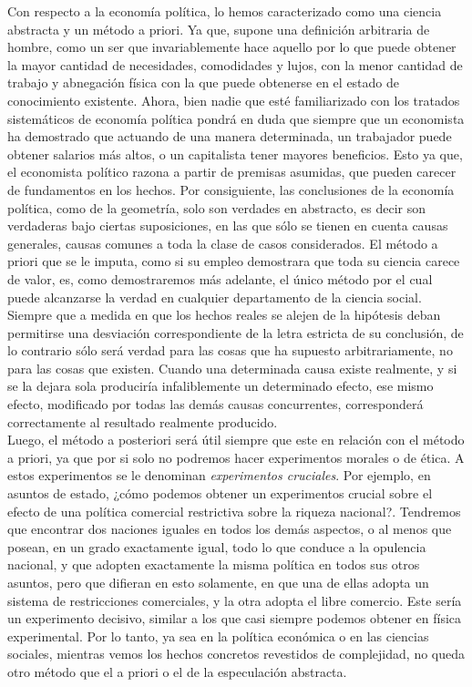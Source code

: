 Con respecto a la economía política, lo hemos caracterizado como una ciencia abstracta y un método a priori. Ya que, supone una definición arbitraria de hombre, como un ser que invariablemente hace aquello por lo que puede obtener la mayor cantidad de necesidades, comodidades y lujos, con la menor cantidad de trabajo y abnegación física con la que puede obtenerse en el estado de conocimiento existente. Ahora, bien nadie que esté familiarizado con los tratados sistemáticos de economía política pondrá en duda que siempre que un economista ha demostrado que actuando de una manera determinada, un trabajador puede obtener salarios más altos, o un capitalista tener mayores beneficios. Esto ya que, el economista político razona a partir de premisas asumidas, que pueden carecer de fundamentos en los hechos. Por consiguiente, las conclusiones de la economía política, como de la geometría, solo son verdades en abstracto, es decir son verdaderas bajo ciertas suposiciones, en las que sólo se tienen en cuenta causas generales, causas comunes a toda la clase de casos considerados. El método a priori que se le imputa, como si su empleo demostrara que toda su ciencia carece de valor, es, como demostraremos más adelante, el único método por el cual puede alcanzarse la verdad en cualquier departamento de la ciencia social. Siempre que a medida en que los hechos reales se alejen de la hipótesis deban permitirse una desviación correspondiente de la letra estricta de su conclusión, de lo contrario sólo será verdad para las cosas que ha supuesto arbitrariamente, no para las cosas que existen. Cuando una determinada causa existe realmente, y si se la dejara sola produciría infaliblemente un determinado efecto, ese mismo efecto, modificado por todas las demás causas concurrentes, corresponderá correctamente al resultado realmente producido.\\

Luego, el método a posteriori será útil siempre que este en relación con el método a priori, ya que por si solo no podremos hacer experimentos morales o de ética. A estos experimentos se le denominan \textit{experimentos cruciales}. Por ejemplo, en asuntos de estado, ¿cómo podemos obtener un experimentos crucial sobre el efecto de una política comercial restrictiva sobre la riqueza nacional?. Tendremos que encontrar dos naciones iguales en todos los demás aspectos, o al menos que posean, en un grado exactamente igual, todo lo que conduce a la opulencia nacional, y que adopten exactamente la misma política en todos sus otros asuntos, pero que difieran en esto solamente, en que una de ellas adopta un sistema de restricciones comerciales, y la otra adopta el libre comercio. Este sería un experimento decisivo, similar a los que casi siempre podemos obtener en física experimental. Por lo tanto, ya sea en la política económica o en las ciencias sociales, mientras vemos los hechos concretos revestidos de complejidad, no queda otro método que el a priori o el de la especulación abstracta.\\


